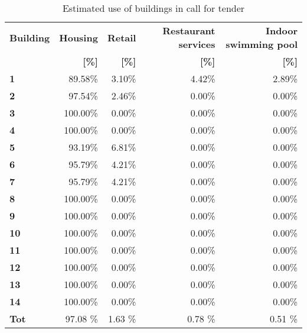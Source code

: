 \begin{table}[h!]
\centering
\caption{Estimated use of buildings in call for tender}\vspace{2mm}
\label{tab:ppa_buildinguse}
\begin{tabular}{lrrrr}
\toprule
\textbf{Building} & \textbf{Housing} & \textbf{Retail} & \textbf{Restaurant services} & \textbf{Indoor swimming pool} \\
                  & \textbf{[\%]}               & \textbf{[\%]}      & \textbf{[\%]}          & \textbf{[\%]}              \\
                  \midrule
\textbf{1}        & 89.58\%                     & 3.10\%             & 4.42\%                 & 2.89\%                     \\
\textbf{2}        & 97.54\%                     & 2.46\%             & 0.00\%                 & 0.00\%                     \\
\textbf{3}        & 100.00\%                    & 0.00\%             & 0.00\%                 & 0.00\%                     \\
\textbf{4}        & 100.00\%                    & 0.00\%             & 0.00\%                 & 0.00\%                     \\
\textbf{5}        & 93.19\%                     & 6.81\%             & 0.00\%                 & 0.00\%                     \\
\textbf{6}        & 95.79\%                     & 4.21\%             & 0.00\%                 & 0.00\%                     \\
\textbf{7}        & 95.79\%                     & 4.21\%             & 0.00\%                 & 0.00\%                     \\
\textbf{8}        & 100.00\%                    & 0.00\%             & 0.00\%                 & 0.00\%                     \\
\textbf{9}        & 100.00\%                    & 0.00\%             & 0.00\%                 & 0.00\%                     \\
\textbf{10}       & 100.00\%                    & 0.00\%             & 0.00\%                 & 0.00\%                     \\
\textbf{11}       & 100.00\%                    & 0.00\%             & 0.00\%                 & 0.00\%                     \\
\textbf{12}       & 100.00\%                    & 0.00\%             & 0.00\%                 & 0.00\%                     \\
\textbf{13}       & 100.00\%                    & 0.00\%             & 0.00\%                 & 0.00\%                     \\
\textbf{14}       & 100.00\%                    & 0.00\%             & 0.00\%                 & 0.00\%                     \\ \midrule
\textbf{Tot}	  & 97.08 \%					& 1.63 \%			& 0.78 \%					& 0.51 \%					\\
\bottomrule
\end{tabular}
\end{table}